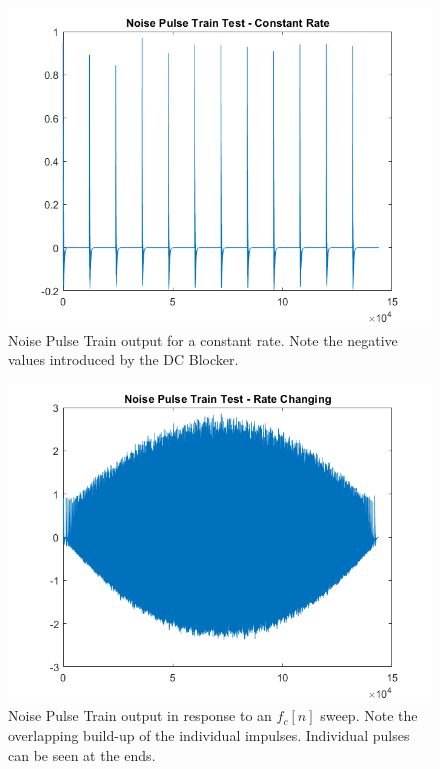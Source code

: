 \documentclass[../main.tex]{subfiles}
\begin{document}
\begin{figure}[h!]
    \centering
    \includegraphics[scale=.55]{./images/plots/NPTTest1.png}
    \caption{Noise Pulse Train output for a constant rate. Note the negative values introduced by the DC Blocker.}
    \label{fig:NPTT1}
\end{figure}

\clearpage

\begin{figure}[t]
    \centering
    \includegraphics[scale=.65]{./images/plots/NPTTest2.png}
    \caption{Noise Pulse Train output in response to an $f_c[n]$ sweep. Note the overlapping build-up of the individual impulses. Individual pulses can be seen at the ends.}
    \label{fig:NPTT2}
\end{figure}
\end{document}
